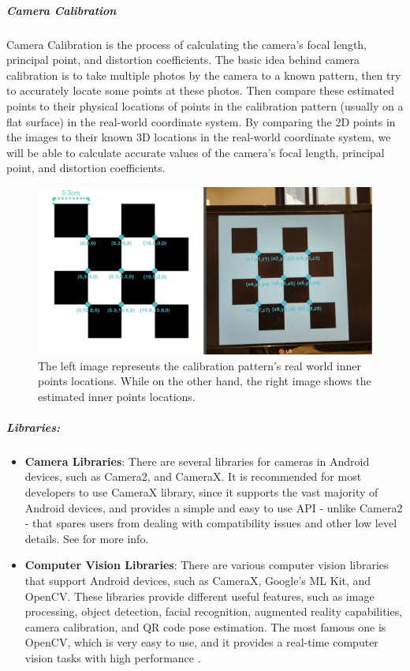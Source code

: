\subparagraph{Camera Calibration}
\label{Camera Calibration Background}
Camera Calibration is the process of calculating the camera's focal length, principal point, and distortion coefficients. The basic idea behind camera calibration is to take multiple photos by the camera to a known pattern, then try to accurately locate some points at these photos. Then compare these estimated points to their physical locations of points in the calibration pattern (usually on a flat surface) in the real-world coordinate system. By comparing the 2D points in the images to their known 3D locations in the real-world coordinate system, we will be able to calculate accurate values of the camera's focal length, principal point, and distortion coefficients.

\begin{figure}[h] %
	\centering
	\includegraphics[width=\textwidth]{assets/ch3/calibration illustration image/calibration illustration image.png}
	\caption{ The left image represents the calibration pattern's real world inner points locations. While on the other hand, the right image shows the estimated inner  points locations. }
	\label{Calibration_Illustrator}
\end{figure}

\subparagraph{Libraries:}
\label{localization libraries BG}
\begin{itemize}
\item \textbf{Camera Libraries}:
There are several libraries for cameras in Android devices, such as Camera2, and CameraX. It is recommended for most developers to use CameraX library, since it supports the vast majority of Android devices, and provides a simple and easy to use API - unlike Camera2 - that spares users from dealing with compatibility issues and other low level details. See \cite{whichCameraLibToUse} for more info.
\end{itemize}
\begin{itemize}
	\item \textbf{Computer Vision Libraries}:
	There are various computer vision libraries that support Android devices, such as CameraX, Google's ML Kit, and OpenCV. These libraries provide different useful features, such as image processing, object detection, facial recognition, augmented reality capabilities, camera calibration, and QR code pose estimation. The most famous one is OpenCV, which is very easy to use, and it provides a real-time computer vision tasks with high performance \cite{OpenCV}.
\end{itemize}

